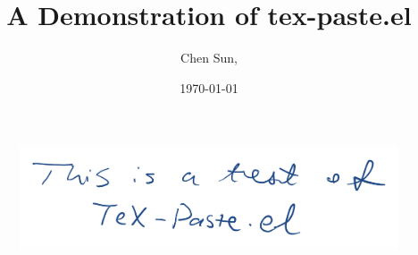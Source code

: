 \documentclass[11pt,a4paper]{article}
\begin{document}
\title{
  A Demonstration of tex-paste.el
}

\author[a]{Chen Sun,}


\date{\today}




\maketitle


\lipsum[20]

\begin{figure}[ht]
    \centering
    \includegraphics[width=.8\textwidth]{drawings/testfigure.png}
    \label{fig:testfigure}
    \caption{}
\end{figure}

\lipsum[20]




\end{document}
